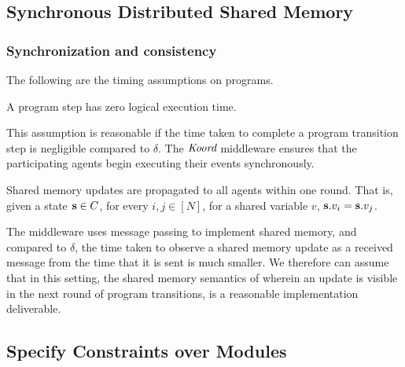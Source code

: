 \subsection{Synchronous Distributed Shared Memory}
\label{sec:memory}


\subsubsection{Synchronization and consistency}
The following are the timing assumptions on \lgname programs.
\begin{assumption} A program step has zero logical execution time.
\end{assumption}
This assumption is reasonable if the time taken to complete a program transition step is negligible compared to $\delta$.  The $\emph{Koord}$ middleware ensures that the participating agents begin executing their events synchronously.

\begin{assumption}
    \label{shared}
    Shared memory updates are propagated to all agents within one round. That is, given a state ${\textbf{s}}\in C$, for every  $i,j \in [N]$, for a shared variable $v$, ${\textbf{s}}.v_i = {\textbf{s}}.v_j$.
\end{assumption}
The \lgname middleware uses message passing to implement shared memory, and compared to $\delta$, the time taken to observe a shared memory update as a received message from the time that it is sent is much smaller. We therefore can assume that in this setting, the shared memory semantics of \lgname wherein an update is visible in the next round of program transitions, is a reasonable implementation deliverable.



\subsection{Specify Constraints over Modules}
\label{sec:module}
